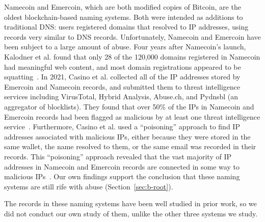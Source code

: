 Namecoin and Emercoin, which are both modified copies of Bitcoin, are 
the oldest blockchain-based naming systems. Both were 
intended as additions to traditional DNS: users registered domains that 
resolved to IP addresses, using records very similar to DNS 
records. Unfortunately, Namecoin and Emercoin have been subject to a large 
amount of abuse. Four years after Namecoin's launch, Kalodner et al. found that 
only 28 of the 120,000 domains registered in Namecoin had meaningful web 
content, and most domain registrations appeared to be 
squatting~\cite{kalodner_namecoin_2015}. 
In 2021, Casino et al. collected all of the IP addresses stored by Emercoin 
and Namecoin records, and submitted them to threat intelligence services 
including VirusTotal, Hybrid Analysis, Abuse.ch, and Pydnsbl (an aggregator of 
blocklists). They found that over 50\% of the IPs in Namecoin and Emercoin 
records had been flagged as malicious by at least one threat intelligence 
service~\cite{casino_unearthing_2021}. Furthermore, Casino et al. used a 
``poisoning'' approach to find IP addresses associated with malicious IPs, 
either because they were stored in the same wallet, the name resolved to them, 
or the same email was recorded in their records. This ``poisoning'' approach 
revealed that the vast majority of IP addresses in Namecoin and Emercoin 
records are connected in some way to malicious 
IPs~\cite{casino_unearthing_2021}. 
Our own findings support the conclusion that these naming 
systems are still rife with abuse (Section~\ref{sec:b-root}). 

The records in these naming systems have been well studied in 
prior work, so we did not conduct our own study of them, 
unlike the other three systems we study.


